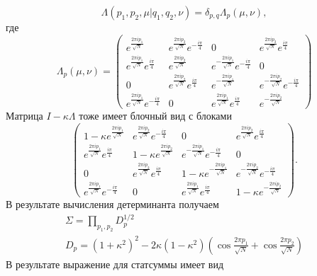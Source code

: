 \documentclass[a4paper,12pt]{article} \usepackage[utf8x]{inputenc} \usepackage[russian]{babel}
\theoremstyle{definition} \newtheorem{corollary}{Corollary}[theorem] \theoremstyle{definition}
\begin{document}
\begin{equation}
  \label{eq:129} \Lambda(p_1,p_2,\mu|q_1,q_2,\nu)=\delta_{p,q}\Lambda_p (\mu,\nu),
\end{equation} где
\begin{equation}
  \label{eq:130} \Lambda_p(\mu,\nu)=
  \begin{pmatrix} e^{\frac{2\pi i p_1}{\sqrt N}} & e^{\frac{2\pi i p_2}{\sqrt N}}
e^{-\frac{i\pi}{4}} & 0 & e^{\frac{2\pi i p_2}{\sqrt N}} e^{\frac{i\pi}{4}} \\ e^{\frac{2\pi i
p_1}{\sqrt N}} e^{\frac{i\pi}{4}} & e^{\frac{2\pi i p_2}{\sqrt N}} & e^{-\frac{2\pi i p_1}{\sqrt N}}
e^{-\frac{i\pi}{4}} & 0 \\ 0 & e^{\frac{2\pi i p_2}{\sqrt N}} e^{\frac{i\pi}{4}} & e^{-\frac{2\pi i
p_1}{\sqrt N}} & e^{-\frac{2\pi i p_2}{\sqrt N}} e^{-\frac{i\pi}{4}} \\ e^{\frac{2\pi i p_1}{\sqrt
N}} e^{-\frac{i\pi}{4}} & 0 & e^{\frac{2\pi i p_1}{\sqrt N}} e^{\frac{i\pi}{4}} & e^{-\frac{2\pi i
p_2}{\sqrt N}}
  \end{pmatrix}
\end{equation} Матрица $I-\kappa\Lambda$ тоже имеет блочный вид с блоками
\begin{equation}
  \label{eq:131}
  \begin{pmatrix} 1-\kappa e^{\frac{2\pi i p_1}{\sqrt N}} & e^{\frac{2\pi i p_2}{\sqrt N}}
e^{-\frac{i\pi}{4}} & 0 & e^{\frac{2\pi i p_2}{\sqrt N}} e^{\frac{i\pi}{4}} \\ e^{\frac{2\pi i
p_1}{\sqrt N}} e^{\frac{i\pi}{4}} & 1-\kappa e^{\frac{2\pi i p_2}{\sqrt N}} & e^{-\frac{2\pi i
p_1}{\sqrt N}} e^{-\frac{i\pi}{4}} & 0 \\ 0 & e^{\frac{2\pi i p_2}{\sqrt N}} e^{\frac{i\pi}{4}} &
1-\kappa e^{-\frac{2\pi i p_1}{\sqrt N}} & e^{-\frac{2\pi i p_2}{\sqrt N}} e^{-\frac{i\pi}{4}} \\
e^{\frac{2\pi i p_1}{\sqrt N}} e^{-\frac{i\pi}{4}} & 0 & e^{\frac{2\pi i p_1}{\sqrt N}}
e^{\frac{i\pi}{4}} & 1- \kappa e^{-\frac{2\pi i p_2}{\sqrt N}}
  \end{pmatrix}.
\end{equation} В результате вычисления детерминанта получаем
\begin{eqnarray}
  \label{eq:132} \Sigma=\prod_{p_1,p_2} D^{1/2}_{p}\\ D_p=(1+\kappa^2)^2 -2\kappa (1-\kappa^2)\left(
\cos \frac{2\pi p_1}{\sqrt N} +\cos \frac{2\pi p_2}{\sqrt N}\right)
\end{eqnarray} В результате выражение для статсуммы имеет вид
\end{document}
